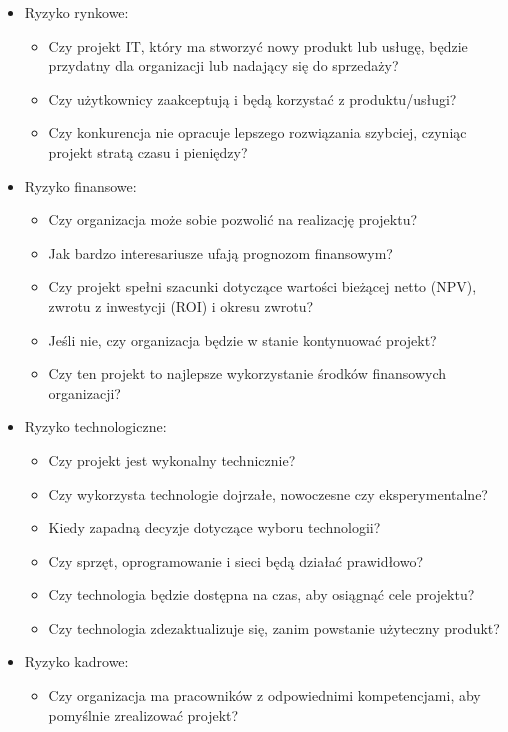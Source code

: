\begin{itemize}
    \item Ryzyko rynkowe:
    \begin{itemize}
        \item Czy projekt IT, który ma stworzyć nowy produkt lub usługę, będzie przydatny dla organizacji lub nadający się do sprzedaży?
        \item Czy użytkownicy zaakceptują i będą korzystać z produktu/usługi?
        \item Czy konkurencja nie opracuje lepszego rozwiązania szybciej, czyniąc projekt stratą czasu i pieniędzy?
    \end{itemize} 
    \item Ryzyko finansowe:
    \begin{itemize}
        \item Czy organizacja może sobie pozwolić na realizację projektu?
        \item Jak bardzo interesariusze ufają prognozom finansowym?
        \item Czy projekt spełni szacunki dotyczące wartości bieżącej netto (NPV), zwrotu z inwestycji (ROI) i okresu zwrotu?
        \item Jeśli nie, czy organizacja będzie w stanie kontynuować projekt?
        \item Czy ten projekt to najlepsze wykorzystanie środków finansowych organizacji?
    \end{itemize} 
    \item Ryzyko technologiczne:
    \begin{itemize}
        \item Czy projekt jest wykonalny technicznie?
        \item Czy wykorzysta technologie dojrzałe, nowoczesne czy eksperymentalne?
        \item Kiedy zapadną decyzje dotyczące wyboru technologii?
        \item Czy sprzęt, oprogramowanie i sieci będą działać prawidłowo?
        \item Czy technologia będzie dostępna na czas, aby osiągnąć cele projektu?
        \item Czy technologia zdezaktualizuje się, zanim powstanie użyteczny produkt?
    \end{itemize}
    \item Ryzyko kadrowe:
    \begin{itemize}
        \item Czy organizacja ma pracowników z odpowiednimi kompetencjami, aby pomyślnie zrealizować projekt?

\end{itemize}
\end{itemize}
